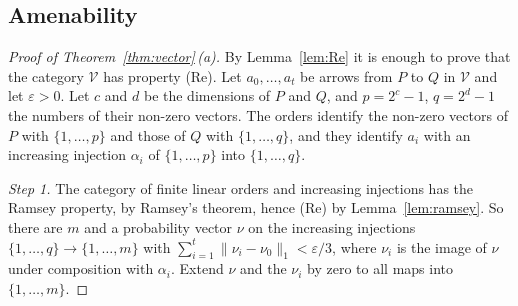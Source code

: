 \documentclass[11pt,a4paper]{article}
\theoremstyle{definition}
\newcommand{\V}{\mathcal{V}}
\begin{document}
\subsection{Amenability}

\begin{proof}[Proof of Theorem~\ref{thm:vector}\,\textup{(a)}]
By Lemma~\ref{lem:Re} it is enough to prove that the category $\V$ has
property \textup{(Re)}. Let $a_0,\dots,a_t$ be arrows from $P$ to $Q$ in
$\V$ and let $\varepsilon>0$. Let $c$ and $d$
be the dimensions of $P$ and $Q$, and $p=2^c-1$, $q=2^d-1$ the numbers of
their non-zero vectors. The orders identify the non-zero vectors of $P$
with $\{1,\dots,p\}$ and those of $Q$ with $\{1,\dots,q\}$, and they
identify $a_i$ with an increasing injection $\alpha_i$ of
$\{1,\dots,p\}$ into $\{1,\dots,q\}$.

\emph{Step 1.} The category of finite linear orders and increasing
injections has the Ramsey property, by Ramsey's theorem, hence
\textup{(Re)} by Lemma~\ref{lem:ramsey}. So there are $m$ and a probability
vector $\nu$ on the increasing injections
$\{1,\dots,q\}\to\{1,\dots,m\}$ with
$\sum_{i=1}^t\|\nu_i-\nu_0\|_1<\varepsilon/3$, where $\nu_i$ is the image
of $\nu$ under composition with $\alpha_i$. Extend $\nu$ and the $\nu_i$ by
zero to all maps into $\{1,\dots,m\}$.


\end{proof}
\end{document}
